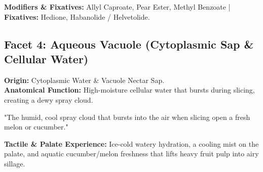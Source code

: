 \documentclass[11pt,a4paper]{article}
\begin{document}
\textbf{Modifiers \& Fixatives:} Allyl Caproate, Pear Ester, Methyl Benzoate | \textbf{Fixatives:} Hedione, Habanolide / Helvetolide.

\vspace{1.5em}

\subsection{Facet 4: Aqueous Vacuole (Cytoplasmic Sap \& Cellular Water)}

\begin{botanicalbox}
\textbf{Origin:} Cytoplasmic Water \& Vacuole Nectar Sap.\\
\textbf{Anatomical Function:} High-moisture cellular water that bursts during slicing, creating a dewy spray cloud.
\end{botanicalbox}

\begin{sensoryquote}
"The humid, cool spray cloud that bursts into the air when slicing open a fresh melon or cucumber."
\end{sensoryquote}

\begin{flavourbox}
\textbf{Tactile \& Palate Experience:} Ice-cold watery hydration, a cooling mist on the palate, and aquatic cucumber/melon freshness that lifts heavy fruit pulp into airy sillage.
\end{flavourbox}

\begin{table}[htbp]
\centering
\caption{Primary Impact Actors for Facet 4 (Aqueous Vacuole)}
\vspace{0.3em}
\end{table}
\end{document}
